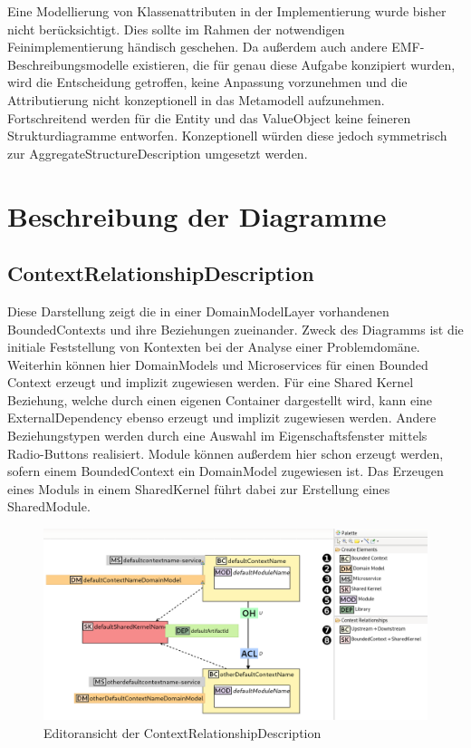 Eine Modellierung von Klassenattributen in der Implementierung wurde bisher nicht berücksichtigt. Dies sollte im Rahmen der notwendigen Feinimplementierung händisch geschehen. Da außerdem auch andere EMF-Beschreibungsmodelle existieren, die für genau diese Aufgabe konzipiert wurden, wird die Entscheidung getroffen, keine Anpassung vorzunehmen und die Attributierung nicht konzeptionell in das Metamodell aufzunehmen. Fortschreitend werden für die Entity und das ValueObject keine feineren Strukturdiagramme entworfen. Konzeptionell würden diese jedoch symmetrisch zur AggregateStructureDescription umgesetzt werden.

\newpage
\section{Beschreibung der Diagramme}

\subsection{ContextRelationshipDescription}

Diese Darstellung zeigt die in einer DomainModelLayer vorhandenen BoundedContexts und ihre Beziehungen zueinander. Zweck des Diagramms ist die initiale Feststellung von Kontexten bei der Analyse einer Problemdomäne. Weiterhin können hier DomainModels und Microservices für einen Bounded Context erzeugt und implizit zugewiesen werden. Für eine Shared Kernel Beziehung, welche durch einen eigenen Container dargestellt wird, kann eine ExternalDependency ebenso erzeugt und implizit zugewiesen werden. Andere Beziehungstypen werden durch eine Auswahl im Eigenschaftsfenster mittels Radio-Buttons realisiert. Module können außerdem hier schon erzeugt werden, sofern einem BoundedContext ein DomainModel zugewiesen ist. Das Erzeugen eines Moduls in einem SharedKernel führt dabei zur Erstellung eines SharedModule.

\begin{figure}[ht]
\centering
\includegraphics[width=\textwidth]{bilder/k5/1.png}
\caption{Editoransicht der ContextRelationshipDescription}
\end{figure}


